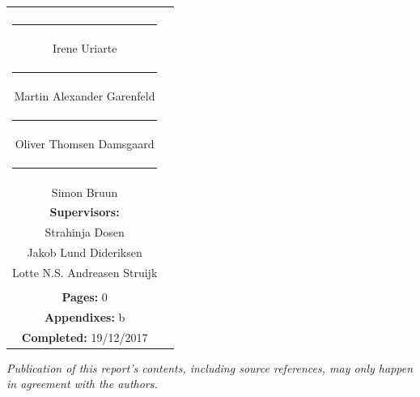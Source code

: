 \begin{titlepage}
\begin{tabular}{cc}
{{				\textbf{Collaborators:}\\
				\rule{5cm}{1pt}\\
				Irene Uriarte \\
				\rule{5cm}{1pt}\\
				Martin Alexander Garenfeld \\
				\rule{5cm}{1pt}\\
				Oliver Thomsen Damsgaard \\
				\rule{5cm}{1pt}\\
				Simon Bruun \\
				
				\textbf{Supervisors:}\\
				Strahinja Dosen \\
				Jakob Lund Dideriksen \\
				Lotte N.S. Andreasen Struijk \\
			}\\
			
			
			\textbf{Pages:} 0\\
			\textbf{Appendixes:} b \\
			\textbf{Completed:} 19/12/2017\\
			
		\end{tabular}
		
		
		
		\centering
		\textit{Publication of this report's contents, including source references, may only happen in agreement with the authors.}\\
		
		
	\end{titlepage}
